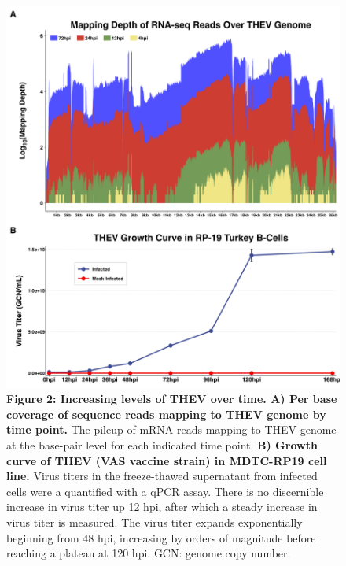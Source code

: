 \documentclass[
]{article}
\begin{document}
\begin{figure}
\centering
\includegraphics{results/r/figures/fig_2.png}
\caption{\textbf{Figure 2: Increasing levels of THEV over time. A) Per
base coverage of sequence reads mapping to THEV genome by time point.}
The pileup of mRNA reads mapping to THEV genome at the base-pair level
for each indicated time point. \textbf{B) Growth curve of THEV (VAS
vaccine strain) in MDTC-RP19 cell line.} Virus titers in the
freeze-thawed supernatant from infected cells were a quantified with a
qPCR assay. There is no discernible increase in virus titer up 12 hpi,
after which a steady increase in virus titer is measured. The virus
titer expands exponentially beginning from 48 hpi, increasing by orders
of magnitude before reaching a plateau at 120 hpi. GCN: genome copy
number.}
\end{figure}
\end{document}
